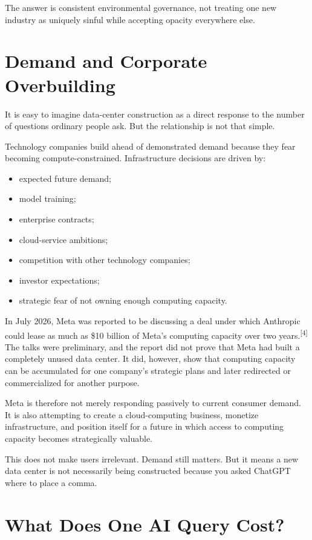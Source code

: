 \documentclass{article}
\begin{document}
The answer is consistent environmental governance, not treating one new industry as uniquely sinful while accepting opacity everywhere else.

\section*{Demand and Corporate Overbuilding}

It is easy to imagine data-center construction as a direct response to the number of questions ordinary people ask. But the relationship is not that simple.

Technology companies build ahead of demonstrated demand because they fear becoming compute-constrained. Infrastructure decisions are driven by:

\begin{itemize}[noitemsep]
    \item expected future demand;
    \item model training;
    \item enterprise contracts;
    \item cloud-service ambitions;
    \item competition with other technology companies;
    \item investor expectations;
    \item strategic fear of not owning enough computing capacity.
\end{itemize}

In July 2026, Meta was reported to be discussing a deal under which Anthropic could lease as much as \$10 billion of Meta's computing capacity over two years.\textsuperscript{[4]} The talks were preliminary, and the report did not prove that Meta had built a completely unused data center. It did, however, show that computing capacity can be accumulated for one company's strategic plans and later redirected or commercialized for another purpose.

Meta is therefore not merely responding passively to current consumer demand. It is also attempting to create a cloud-computing business, monetize infrastructure, and position itself for a future in which access to computing capacity becomes strategically valuable.

This does not make users irrelevant. Demand still matters. But it means a new data center is not necessarily being constructed because you asked ChatGPT where to place a comma.

\section*{What Does One AI Query Cost?}
\end{document}
